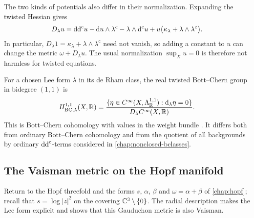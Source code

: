 The two kinds of potentials also differ in their normalization. Expanding the twisted Hessian gives
\begin{equation}\label{eq:lck-twisted-expansion}
 D_\lambda u
 =\mathrm{dd}^{\mathrm{c}} u-\mathrm{d}u\wedge\lambda^{\mathrm c}
       -\lambda\wedge\mathrm d^{\mathrm c} u
       +u\bigl(\kappa_\lambda+\lambda\wedge\lambda^{\mathrm c}\bigr).
\end{equation}
In particular,
$D_\lambda1=\kappa_\lambda+\lambda\wedge\lambda^{\mathrm c}$ need not vanish, so adding a constant to $u$ can change the metric $\omega+D_\lambda u$. The usual normalization $\sup_Xu=0$ is therefore not harmless for twisted equations.

For a chosen Lee form $\lambda$ in its de Rham class, the real twisted Bott--Chern group in bidegree $(1,1)$ is
\[
 H^{1,1}_{\mathrm{BC},\lambda}(X,\mathbb R)
 =\frac{\{\eta\in C^\infty(X,\Lambda^{1,1}_{\mathbb R}):
                       \mathrm{d}_\lambda\eta=0\}}
        {D_\lambda C^\infty(X,\mathbb R)}.
\]
This is Bott--Chern cohomology with values in the weight bundle \cite[Section 18.5]{OV24LCK}. It differs both from ordinary Bott--Chern cohomology and from the quotient of all backgrounds by ordinary $\mathrm{dd}^{\mathrm{c}}$-terms considered in \cref{chap:nonclosed-bclasses}.

\subsection{The Vaisman metric on the Hopf manifold}

Return to the Hopf threefold and the forms $s$, $\alpha$, $\beta$ and $\omega=\alpha+\beta$ of \cref{chap:hopf}; recall that $s=\log|z|^2$ on the covering $\mathbb C^3\setminus\{0\}$. The radial description makes the Lee form explicit and shows that this Gauduchon metric is also Vaisman.

